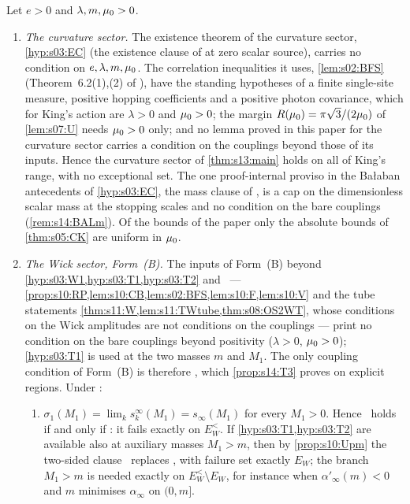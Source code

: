 \begin{lemma}\label{lem:s14:CW}
Let $e>0$ and $\lambda,m,\mu_0>0$.
\begin{enumerate}[label=\textup{(\alph*)},leftmargin=*]
\item \emph{The curvature sector.} The existence theorem of the curvature sector, \cref{hyp:s03:EC} (the existence clause of \cite[Thm.~2.1]{K2} at zero scalar source), carries no condition on $e,\lambda,m,\mu_0$. The correlation inequalities it uses, \cref{lem:s02:BFS} (Theorem~6.2(1),(2) of \cite{BFS1}), have the standing hypotheses of a finite single-site measure, positive hopping coefficients and a positive photon covariance, which for King's action are $\lambda>0$ and $\mu_0>0$; the margin $R(\mu_0)=\pi\sqrt3/(2\mu_0)$ of \cref{lem:s07:U} needs $\mu_0>0$ only; and no lemma proved in this paper for the curvature sector carries a condition on the couplings beyond those of its inputs. Hence the curvature sector of \cref{thm:s13:main} holds on all of King's range, with no exceptional set. The one proof-internal proviso in the Ba{\l}aban antecedents of \cref{hyp:s03:EC}, the mass clause of \cite[Prop.~3.1]{Ba2}, is a cap on the dimensionless scalar mass at the stopping scales and no condition on the bare couplings (\cref{rem:s14:BALm}). Of the bounds of the paper only the absolute bounds of \cref{thm:s05:CK} are uniform in $\mu_0$.
\item \emph{The Wick sector, Form~(B).} The inputs of Form~(B) beyond \cref{hyp:s03:W1,hyp:s03:T1,hyp:s03:T2} and \Tthree\ --- \cref{prop:s10:RP,lem:s10:CB,lem:s02:BFS,lem:s10:F,lem:s10:V} and the tube statements \cref{thm:s11:W,lem:s11:TWtube,thm:s08:OS2WT}, whose conditions on the Wick amplitudes are not conditions on the couplings --- print no condition on the bare couplings beyond positivity ($\lambda>0$, $\mu_0>0$); \cref{hyp:s03:T1} is used at the two masses $m$ and $M_1$. The only coupling condition of Form~(B) is therefore \Tthree, which \cref{prop:s14:T3} proves on explicit regions. Under \sxivCT:
\begin{enumerate}[label=\textup{(\roman*)},nosep,leftmargin=*]
\item $\sigma_1(M_1)=\lim_ks^\infty_k(M_1)=s_\infty(M_1)$ for every $M_1>0$. Hence \Tthree\ holds if and only if \sxivNEl: it fails exactly on $E^<_W$. If \cref{hyp:s03:T1,hyp:s03:T2} are available also at auxiliary masses $M_1>m$, then by \cref{prop:s10:Upm} the two-sided clause \sxivNE\ replaces \Tthree, with failure set exactly $E_W$; the branch $M_1>m$ is needed exactly on $E^<_W\setminus E_W$, for instance when $\alpha'_\infty(m)<0$ and $m$ minimises $\alpha_\infty$ on $(0,m]$.

\end{enumerate}
\end{enumerate}
\end{lemma}
